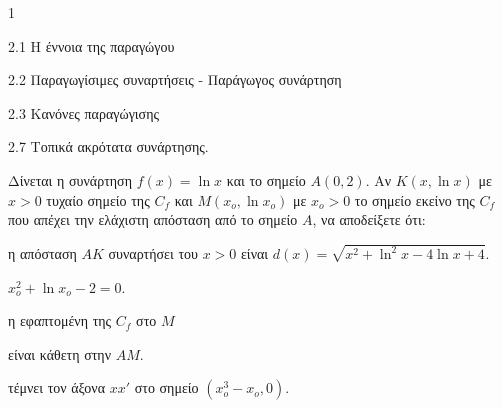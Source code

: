 \begin{ylh}{1}
    \item 2.1 Η έννοια της παραγώγου
    \item 2.2 Παραγωγίσιμες συναρτήσεις - Παράγωγος συνάρτηση
    \item 2.3 Κανόνες παραγώγισης
    \item 2.7 Τοπικά ακρότατα συνάρτησης.
\end{ylh}
Δίνεται η συνάρτηση $f(x)=\ln x$ και το σημείο $A(0,2)$. Αν $K(x,\ln x)$ με $x>0$ τυχαίο σημείο της $C_f$ και $M(x_o,\ln x_o)$ με $x_o>0$ το σημείο εκείνο της $C_f$ που απέχει την ελάχιστη απόσταση από το σημείο $A$, να αποδείξετε ότι:
\begin{alist}
\item η απόσταση $AK$ συναρτήσει του $x>0$ είναι $d(x) = \sqrt{x^2 + \ln^2 x-4\ln x+4}.$ 
\item $x_o^2+\ln x_o-2=0.$ 
\item η εφαπτομένη της $C_f$ στο $M$
    \begin{rlist}
    \item είναι κάθετη στην $AM$. 
    \item τέμνει τον άξονα $xx'$ στο σημείο $(x_o^3-x_o,0)$. 
    \end{rlist}
\end{alist}